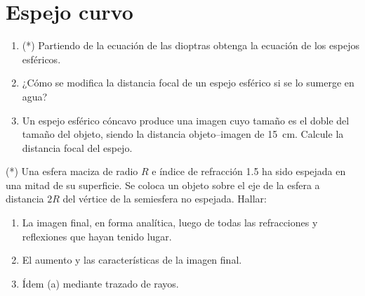 \section*{Espejo curvo}

\item
\begin{enumerate}
	\item (*) Partiendo de la ecuación de las dioptras obtenga la ecuación de los espejos esféricos. 
	\item ¿Cómo se modifica la distancia focal de un espejo esférico si se lo sumerge en agua?
	\item Un espejo esférico cóncavo produce una imagen cuyo tamaño es el doble del tamaño del objeto, siendo la distancia objeto--imagen de \SI{15}{\centi\metre}.
	Calcule la distancia focal del espejo.
\end{enumerate}



\item (*) Una esfera maciza de radio $R$ e índice de refracción \num{1.5} ha sido espejada en una mitad de su superficie.
Se coloca un objeto sobre el eje de la esfera a distancia $2R$ del vértice de la semiesfera no espejada.
Hallar:
\begin{enumerate}
\item La imagen final, en forma analítica, luego de todas las refracciones
y reflexiones que hayan tenido lugar.
\item El aumento y las características de la imagen final.
\item Ídem (a) mediante trazado de rayos.
\end{enumerate}

